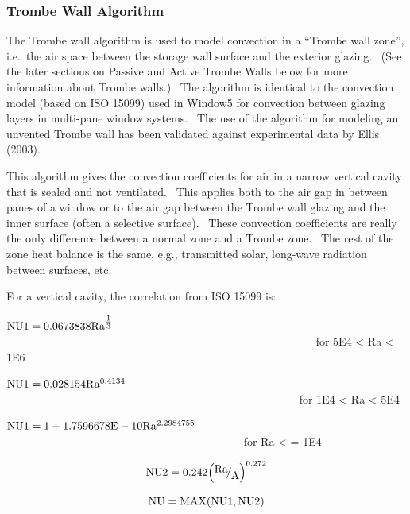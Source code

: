 \subsubsection{Trombe Wall Algorithm}\label{trombe-wall-algorithm}

The Trombe wall algorithm is used to model convection in a ``Trombe wall zone'', i.e.~the air space between the storage wall surface and the exterior glazing.~ (See the later sections on Passive and Active Trombe Walls below for more information about Trombe walls.)~ The algorithm is identical to the convection model (based on ISO 15099) used in Window5 for convection between glazing layers in multi-pane window systems.~ The use of the algorithm for modeling an unvented Trombe wall has been validated against experimental data by Ellis (2003).

This algorithm gives the convection coefficients for air in a narrow vertical cavity that is sealed and not ventilated.~ This applies both to the air gap in between panes of a window or to the air gap between the Trombe wall glazing and the inner surface (often a selective surface).~ These convection coefficients are really the only difference between a normal zone and a Trombe zone.~ The rest of the zone heat balance is the same, e.g., transmitted solar, long-wave radiation between surfaces, etc.

For a vertical cavity, the correlation from ISO 15099 is:

\({\rm{NU1 = 0}}{\rm{.0673838 R}}{{\rm{a}}^{{\textstyle{{\rm{1}} \over {\rm{3}}}}}}\) ~~~~~~~~~~~~~~~~~~~~~~~~~~~~~~~~~~~~~~~~~~~~~~~~~~~~~~~ for 5E4 \textless{} Ra \textless{} 1E6

\({\rm{NU1 = 0}}{\rm{.028154 R}}{{\rm{a}}^{{\rm{0}}{\rm{.4134}}}}\) ~~~~~~~~~~~~~~~~~~~~~~~~~~~~~~~~~~~~~~~~~~~~~~~~~~~~ for 1E4 \textless{} Ra \textless{} 5E4

\({\rm{NU1 = 1 + 1}}{\rm{.7596678E - 10 R}}{{\rm{a}}^{{\rm{2}}{\rm{.2984755}}}}\) ~~~~~~~~~~~~~~~~~~~~~~~~~~~~~~~~~~~~~~~~~~ for Ra \textless{} = 1E4

\begin{equation}
{\rm{NU2}} = 0.242{\left( {{\raise0.7ex\hbox{{{\rm{Ra}}}} \!\mathord{\left/ {\vphantom {{{\rm{Ra}}} {\rm{A}}}}\right.}\!\lower0.7ex\hbox{{\rm{A}}}}} \right)^{0.272}}
\end{equation}

\begin{equation}
{\rm{NU = MAX(NU1,NU2)}}
\end{equation}


